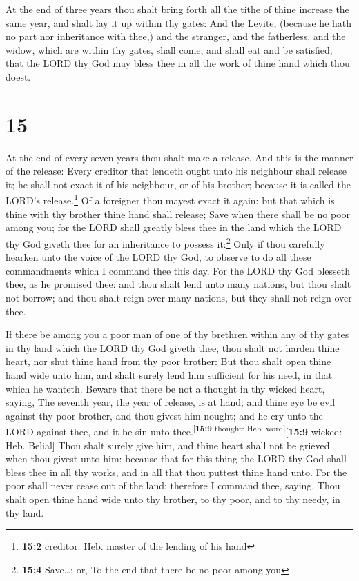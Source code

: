  At the end of three years thou shalt bring forth all the
tithe of thine increase the same year, and shalt lay it up within thy
gates:  And the Levite, (because he hath no part nor
inheritance with thee,) and the stranger, and the fatherless, and the
widow, which are within thy gates, shall come, and shall eat and be
satisfied; that the LORD thy God may bless thee in all the work of thine
hand which thou doest.

\hypertarget{section-14}{%
\section{15}\label{section-14}}

 At the end of every seven years thou shalt make a
release.  And this is the manner of the release: Every
creditor that lendeth ought unto his neighbour shall release it; he
shall not exact it of his neighbour, or of his brother; because it is
called the LORD's release.\footnote{\textbf{15:2} creditor: Heb. master
  of the lending of his hand}  Of a foreigner thou mayest
exact it again: but that which is thine with thy brother thine hand
shall release;  Save when there shall be no poor among
you; for the LORD shall greatly bless thee in the land which the LORD
thy God giveth thee for an inheritance to possess it:\footnote{\textbf{15:4}
  Save\ldots: or, To the end that there be no poor among you}
 Only if thou carefully hearken unto the voice of the LORD
thy God, to observe to do all these commandments which I command thee
this day.  For the LORD thy God blesseth thee, as he
promised thee: and thou shalt lend unto many nations, but thou shalt not
borrow; and thou shalt reign over many nations, but they shall not reign
over thee.

 If there be among you a poor man of one of thy brethren
within any of thy gates in thy land which the LORD thy God giveth thee,
thou shalt not harden thine heart, nor shut thine hand from thy poor
brother:  But thou shalt open thine hand wide unto him,
and shalt surely lend him sufficient for his need, in that which he
wanteth.  Beware that there be not a thought in thy wicked
heart, saying, The seventh year, the year of release, is at hand; and
thine eye be evil against thy poor brother, and thou givest him nought;
and he cry unto the LORD against thee, and it be sin unto
thee.\textsuperscript{{[}\textbf{15:9} thought: Heb.
word{]}}{[}\textbf{15:9} wicked: Heb. Belial{]}  Thou
shalt surely give him, and thine heart shall not be grieved when thou
givest unto him: because that for this thing the LORD thy God shall
bless thee in all thy works, and in all that thou puttest thine hand
unto.  For the poor shall never cease out of the land:
therefore I command thee, saying, Thou shalt open thine hand wide unto
thy brother, to thy poor, and to thy needy, in thy land.

